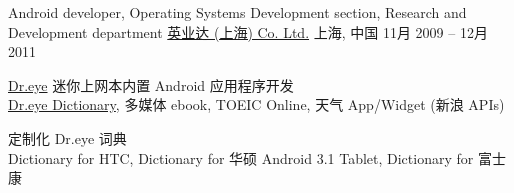 \begin{cventries}
	\cventry
	{Android developer, Operating Systems Development section, Research and Development department}
	{\href{http://www.inventec.com/english/indexEN.htm}{英业达 (上海) Co. Ltd.}}
	{上海, \enskip 中国}
	{11月 2009 – 12月 2011}
	{
		\begin{cvitems}
			\item {\href{http://www.androidcentral.com/android-powered-dr-eye-makes-its-debut}{Dr.eye} 迷你上网本内置 Android 应用程序开发\\
			\href{https://play.google.com/store/apps/details?id=com.inventec.dreye.dictnew}{Dr.eye Dictionary}, 多媒体 ebook, TOEIC Online, 天气 App/Widget (新浪 APIs)}
			\item {定制化 Dr.eye 词典\\
			Dictionary for HTC, Dictionary for 华硕 Android 3.1 Tablet, Dictionary for 富士康}
		\end{cvitems}
	}
\end{cventries}

